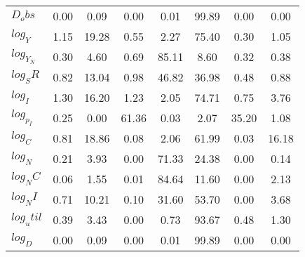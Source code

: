 \begin{center}
\begin{longtable}{lccccccc}
$D_obs     $	 & 	        0.00	 & 	        0.09	 & 	        0.00	 & 	        0.01	 & 	       99.89	 & 	        0.00	 & 	        0.00 \\ 
$log_Y     $	 & 	        1.15	 & 	       19.28	 & 	        0.55	 & 	        2.27	 & 	       75.40	 & 	        0.30	 & 	        1.05 \\ 
$log_Y_N   $	 & 	        0.30	 & 	        4.60	 & 	        0.69	 & 	       85.11	 & 	        8.60	 & 	        0.32	 & 	        0.38 \\ 
$log_SR    $	 & 	        0.82	 & 	       13.04	 & 	        0.98	 & 	       46.82	 & 	       36.98	 & 	        0.48	 & 	        0.88 \\ 
$log_I     $	 & 	        1.30	 & 	       16.20	 & 	        1.23	 & 	        2.05	 & 	       74.71	 & 	        0.75	 & 	        3.76 \\ 
$log_p_I   $	 & 	        0.25	 & 	        0.00	 & 	       61.36	 & 	        0.03	 & 	        2.07	 & 	       35.20	 & 	        1.08 \\ 
$log_C     $	 & 	        0.81	 & 	       18.86	 & 	        0.08	 & 	        2.06	 & 	       61.99	 & 	        0.03	 & 	       16.18 \\ 
$log_N     $	 & 	        0.21	 & 	        3.93	 & 	        0.00	 & 	       71.33	 & 	       24.38	 & 	        0.00	 & 	        0.14 \\ 
$log_NC    $	 & 	        0.06	 & 	        1.55	 & 	        0.01	 & 	       84.64	 & 	       11.60	 & 	        0.00	 & 	        2.13 \\ 
$log_NI    $	 & 	        0.71	 & 	       10.21	 & 	        0.10	 & 	       31.60	 & 	       53.70	 & 	        0.00	 & 	        3.68 \\ 
$log_util  $	 & 	        0.39	 & 	        3.43	 & 	        0.00	 & 	        0.73	 & 	       93.67	 & 	        0.48	 & 	        1.30 \\ 
$log_D     $	 & 	        0.00	 & 	        0.09	 & 	        0.00	 & 	        0.01	 & 	       99.89	 & 	        0.00	 & 	        0.00 \\ 
\end{longtable}
 \end{center}
